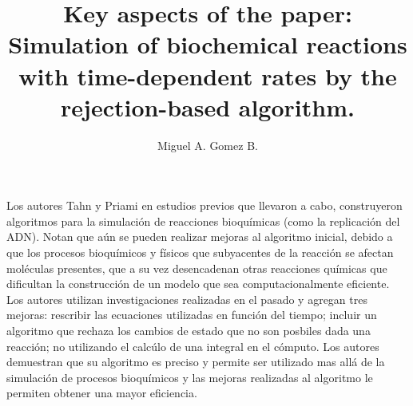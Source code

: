 \documentclass{article}
\title{Key aspects of the paper: Simulation of biochemical reactions with time-dependent rates by the rejection-based algorithm.}
\author{Miguel A. Gomez B.}
\begin{document}
 	\maketitle
 \paragraph{} Los autores Tahn y Priami en estudios previos que llevaron a cabo, construyeron algoritmos para la simulación de reacciones bioquímicas (como la replicación del ADN). Notan que aún se pueden realizar mejoras al algoritmo inicial, debido a que los procesos bioquímicos y físicos que subyacentes de la reacción se afectan moléculas presentes, que a su vez desencadenan otras reacciones químicas que dificultan la construcción de un modelo que sea computacionalmente eficiente. Los autores utilizan investigaciones realizadas en el pasado y agregan tres mejoras: rescribir las ecuaciones utilizadas en función del tiempo; incluir un algoritmo que rechaza los cambios de estado que no son posbiles dada una reacción; no utilizando el calcúlo de una integral en el cómputo. Los autores demuestran que su algoritmo es preciso y permite ser utilizado mas allá de la simulación de procesos bioquímicos y las mejoras realizadas al algoritmo le permiten obtener una mayor eficiencia.
 
\end{document}
